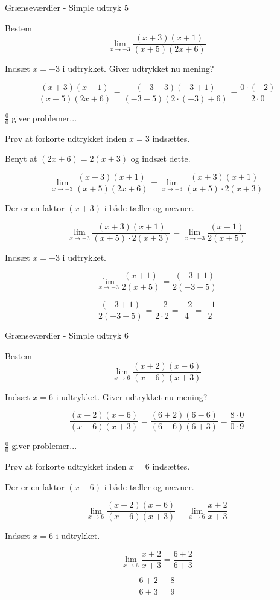 \documentclass{article}
\begin{document}
\newpage
\begin{exercise}{Grænseværdier - Simple udtryk 5}
	
	Bestem 
	\[
	\lim_{x \to -3} \frac{(x+3)(x+1)}{(x+5)(2x+6)}
	\]
	
	
	\hint
	Indsæt $x=-3$ i udtrykket. Giver udtrykket nu mening?
	
	\hint
	\[
	\frac{(x+3)(x+1)}{(x+5)(2x+6)} = \frac{(-3+3)(-3+1)}{(-3+5)(2 \cdot (-3)+6)} = \frac{0 \cdot (-2)}{2 \cdot 0}
	\]
	
	\hint
	$\frac{0}{0}$ giver problemer...
	
	\hint
	Prøv at forkorte udtrykket inden $x=3$ indsættes.
	
	\hint
	Benyt at $(2x+6) = 2 (x+3)$ og indsæt dette.
	
	\hint
	\[
	\lim_{x \to -3} \frac{(x+3)(x+1)}{(x+5)(2x+6)} = \lim_{x \to -3} \frac{(x+3)(x+1)}{(x+5) \cdot 2(x+3)}
	\]
	
	\hint
	Der er en faktor $(x+3)$ i både tæller og nævner.
	
	\hint
	\[
	\lim_{x \to -3} \frac{(x+3)(x+1)}{(x+5) \cdot 2(x+3)} = \lim_{x \to -3} \frac{(x+1)}{2(x+5)}
	\]
	
	\hint
	Indsæt $x=-3$ i udtrykket.
	
	\hint
	\[
	\lim_{x \to -3} \frac{(x+1)}{2(x+5)} = \frac{(-3+1)}{2(-3+5)} 
	\]
	
	\hint
	\[
	 \frac{(-3+1)}{2(-3+5)} = \frac{-2}{2 \cdot 2} = \frac{-2}{4} = \frac{-1}{2}  
	\]
	
	
\end{exercise}

\newpage
\begin{exercise}{Grænseværdier - Simple udtryk 6}
	
	Bestem 
	\[
	\lim_{x \to 6} \frac{(x+2)(x-6)}{(x-6)(x+3)}
	\]
	
	
	\hint
	Indsæt $x=6$ i udtrykket. Giver udtrykket nu mening?
	
	\hint
	\[
	\frac{(x+2)(x-6)}{(x-6)(x+3)} = \frac{(6+2)(6-6)}{(6-6)(6+3)} = \frac{8 \cdot 0}{0 \cdot 9}
	\]
	
	\hint
	$\frac{0}{0}$ giver problemer...
	
	\hint
	Prøv at forkorte udtrykket inden $x=6$ indsættes.
	
	\hint
	Der er en faktor $(x-6)$ i både tæller og nævner.
	
	\hint
	\[
	\lim_{x \to 6} \frac{(x+2)(x-6)}{(x-6)(x+3)} = \lim_{x \to 6} \frac{x+2}{x+3}
	\]
	
	\hint
	Indsæt $x=6$ i udtrykket.
	
	\hint
	\[
	\lim_{x \to 6} \frac{x+2}{x+3} = \frac{6+2}{6+3}
	\]
	
	\hint
	\[
	\frac{6+2}{6+3} = \frac{8}{9}
	\]
	
	
\end{exercise}
\end{document}
